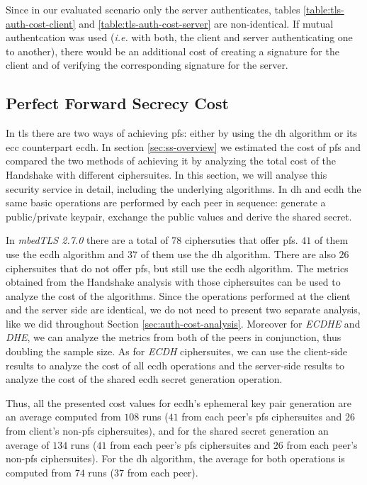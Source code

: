 \documentclass{llncs}
\begin{document}
Since in our evaluated scenario only the server authenticates, tables \ref{table:tls-auth-cost-client} and \ref{table:tls-auth-cost-server}
are non-identical. If mutual authentcation was used (\textit{i.e.} with both, the client and server authenticating one to another), there would be
an additional cost of creating a signature for the client and of verifying the corresponding signature for the server.

\subsection{Perfect Forward Secrecy Cost}

In \gls{tls} there are two ways of achieving \gls{pfs}: either by using the \gls{dh} algorithm or its \gls{ecc} counterpart \gls{ecdh}.
In section \ref{sec:ss-overview} we estimated the cost of \gls{pfs} and compared the two methods of achieving it by analyzing the total cost of the
Handshake with different ciphersuites. In this section, we will analyse this security service in detail, including the underlying algorithms.
In \gls{dh} and \gls{ecdh} the same basic operations are performed by each peer in sequence: generate a public/private keypair, exchange the public values
and derive the shared secret.

In \textit{mbedTLS 2.7.0} there are a total of $78$ ciphersuties that offer \gls{pfs}. $41$ of them use the \gls{ecdh} algorithm and $37$ of them use
the \gls{dh} algorithm. There are also $26$ ciphersuites that do not offer \gls{pfs}, but still use the \gls{ecdh} algorithm. The metrics obtained from the 
Handshake analysis with those ciphersuites can be used to analyze the cost of the algorithms. Since the operations performed at the client and 
the server side are identical, we do not need to present two separate analysis, like we did throughout Section \ref{sec:auth-cost-analysis}. 
Moreover for \textit{ECDHE} and \textit{DHE}, we can analyze the metrics from both  of the peers in conjunction, thus doubling the sample size. 
As for \textit{ECDH} ciphersuites, we can use the client-side results to analyze the cost of all \gls{ecdh} operations and the server-side results 
to analyze the cost of the shared \gls{ecdh} secret generation operation.

Thus, all the presented cost values for \gls{ecdh}'s ephemeral key pair generation are an average computed from $108$ runs ($41$ from each
peer's \gls{pfs} ciphersuites and $26$ from client's non-\gls{pfs} ciphersuites),
and for the shared secret generation an average of $134$ runs ($41$ from each peer's \gls{pfs} ciphersuites and $26$ from each peer's non-\gls{pfs} 
ciphersuites). For the \gls{dh} algorithm, the average for both operations is computed from $74$ runs ($37$ from each peer). 
\end{document}
